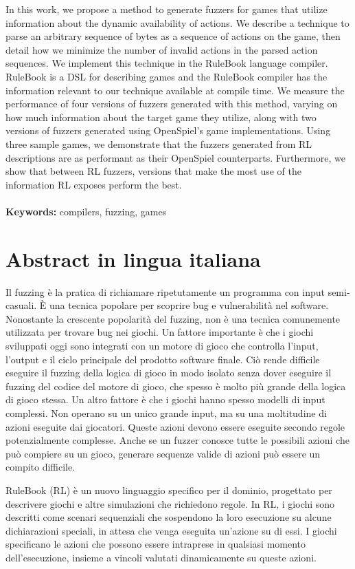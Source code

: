 \documentclass{Configuration_Files/PoliMi3i_thesis}
\begin{document}
In this work, we propose a method to generate fuzzers for games that utilize information about the dynamic availability of actions.
We describe a technique to parse an arbitrary sequence of bytes as a sequence of actions on the game, then detail how we minimize the number of invalid actions in the parsed action sequences.
We implement this technique in the RuleBook language compiler. RuleBook is a DSL for describing games and the RuleBook compiler has the information relevant to our technique available at compile time.
We measure the performance of four versions of fuzzers generated with this method, varying on how much information about the target game they utilize, along with two versions of fuzzers generated using OpenSpiel's game implementations.
Using three sample games, we demonstrate that the fuzzers generated from RL descriptions are as performant as their OpenSpiel counterparts.
Furthermore, we show that between RL fuzzers, versions that make the most use of the information RL exposes perform the best.
\\
\\
\textbf{Keywords:} compilers, fuzzing, games

\chapter*{Abstract in lingua italiana}
Il fuzzing è la pratica di richiamare ripetutamente un programma con input semi-casuali.
È una tecnica popolare per scoprire bug e vulnerabilità nel software.
Nonostante la crescente popolarità del fuzzing, non è una tecnica comunemente utilizzata per trovare bug nei giochi.
Un fattore importante è che i giochi sviluppati oggi sono integrati con un motore di gioco che controlla l'input, l'output e il ciclo principale del prodotto software finale.
Ciò rende difficile eseguire il fuzzing della logica di gioco in modo isolato senza dover eseguire il fuzzing del codice del motore di gioco, che spesso è molto più grande della logica di gioco stessa.
Un altro fattore è che i giochi hanno spesso modelli di input complessi. Non operano su un unico grande input, ma su una moltitudine di azioni eseguite dai giocatori.
Queste azioni devono essere eseguite secondo regole potenzialmente complesse.
Anche se un fuzzer conosce tutte le possibili azioni che può compiere su un gioco, generare sequenze valide di azioni può essere un compito difficile.

RuleBook (RL) è un nuovo linguaggio specifico per il dominio, progettato per descrivere giochi e altre simulazioni che richiedono regole.
In RL, i giochi sono descritti come scenari sequenziali che sospendono la loro esecuzione su alcune dichiarazioni speciali, in attesa che venga eseguita un'azione su di essi.
I giochi specificano le azioni che possono essere intraprese in qualsiasi momento dell'esecuzione, insieme a vincoli valutati dinamicamente su queste azioni.
\end{document}
